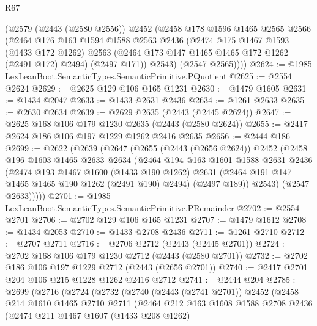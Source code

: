 \begin{lexlean}{R67}
\begin{coremodule}
      (@2579
        (@2443 (@2580 @2556))
        @2452
        (@2458
          @178
          @1596
          @1465
          @2565
          @2566
          (@2464
            @176
            @163
            @1594
            @1588
            @2563
            @2436
            (@2474
              @175
              @1467
              @1593
              (@1433 @172 @1262)
              @2563
              (@2464 @173 @147 @1465 @1465 @172 @1262 (@2491 @172) @2494)
              (@2497 @171))
            @2543)
          (@2547 @2565))))
@2624 := @1985 LexLeanBoot.SemanticTypes.SemanticPrimitive.PQuotient
@2625 := @2554 @2624
@2629 := @2625 @129 @106 @165 @1231
@2630 := @1479 @1605
@2631 := @1434 @2047
@2633 := @1433 @2631 @2436
@2634 := @1261 @2633
@2635 := @2630 @2634
@2639 := @2629 @2635 (@2443 (@2445 @2624))
@2647 := @2625 @168 @106 @179 @1230 @2635 (@2443 (@2580 @2624))
@2655 := @2417 @2624 @186 @106 @197 @1229 @1262 @2416 @2635
@2656 := @2444 @186
@2699 := @2622
    (@2639
      (@2647
        (@2655
          (@2443 (@2656 @2624))
          @2452
          (@2458
            @196
            @1603
            @1465
            @2633
            @2634
            (@2464
              @194
              @163
              @1601
              @1588
              @2631
              @2436
              (@2474
                @193
                @1467
                @1600
                (@1433 @190 @1262)
                @2631
                (@2464 @191 @147 @1465 @1465 @190 @1262 (@2491 @190) @2494)
                (@2497 @189))
              @2543)
            (@2547 @2633)))))
@2701 := @1985 LexLeanBoot.SemanticTypes.SemanticPrimitive.PRemainder
@2702 := @2554 @2701
@2706 := @2702 @129 @106 @165 @1231
@2707 := @1479 @1612
@2708 := @1434 @2053
@2710 := @1433 @2708 @2436
@2711 := @1261 @2710
@2712 := @2707 @2711
@2716 := @2706 @2712 (@2443 (@2445 @2701))
@2724 := @2702 @168 @106 @179 @1230 @2712 (@2443 (@2580 @2701))
@2732 := @2702 @186 @106 @197 @1229 @2712 (@2443 (@2656 @2701))
@2740 := @2417 @2701 @204 @106 @215 @1228 @1262 @2416 @2712
@2741 := @2444 @204
@2785 := @2699
    (@2716
      (@2724
        (@2732
          (@2740
            (@2443 (@2741 @2701))
            @2452
            (@2458
              @214
              @1610
              @1465
              @2710
              @2711
              (@2464
                @212
                @163
                @1608
                @1588
                @2708
                @2436
                (@2474
                  @211
                  @1467
                  @1607
                  (@1433 @208 @1262)

\end{coremodule}
\end{lexlean}
